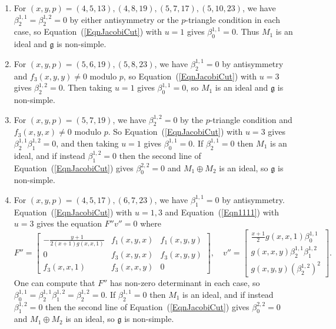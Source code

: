 \documentclass[11pt,a4paper,reqno]{amsart}
\theoremstyle{definition}
\numberwithin{equation}{section}
\newcommand{\fg}{\mathfrak{g}}
\begin{document}
\begin{enumerate}
\item For $(x,y,p)=(4,5,13),(4,8,19),(5,7,17),(5,10,23)$, we have $\beta^{1,1}_2=\beta^{1,2}_2=0$ by either antisymmetry or the $p$-triangle condition in each case, so Equation~(\ref{EqnJacobiCut}) with $u=1$ gives $\beta^{1,1}_0=0$. Thus $M_1$ is an ideal and $\fg$ is non-simple.
\item For $(x,y,p)=(5,6,19),(5,8,23)$, we have $\beta^{1,1}_2=0$ by antisymmetry and $f_3(x,y,y)\neq0$ modulo $p$, so Equation~(\ref{EqnJacobiCut}) with $u=3$ gives $\beta^{1,2}_2=0$. Then taking $u=1$ gives $\beta^{1,1}_0=0$, so $M_1$ is an ideal and $\fg$ is non-simple.
\item For $(x,y,p)=(5,7,19)$, we have $\beta^{1,2}_2=0$ by the $p$-triangle condition and $f_3(x,y,x)\neq0$ modulo $p$. So Equation~(\ref{EqnJacobiCut}) with $u=3$ gives $\beta^{1,1}_2\beta^{1,2}_1=0$, and then taking $u=1$ gives $\beta^{1,1}_0=0$. If $\beta^{1,1}_2=0$ then $M_1$ is an ideal, and if instead $\beta^{1,2}_1=0$ then the second line of Equation~(\ref{EqnJacobiCut}) gives $\beta^{2,2}_0=0$ and $M_1\oplus M_2$ is an ideal, so $\fg$ is non-simple.
\item For $(x,y,p)=(4,5,17),(6,7,23)$, we have $\beta^{1,1}_1=0$ by antisymmetry. Equation~(\ref{EqnJacobiCut}) with $u=1,3$ and Equation~(\ref{Eqn1111}) with $u=3$ gives the equation $F''v''=0$ where
\[F''=\begin{bmatrix}
-\frac{y+1}{2(x+1)g(x,x,1)} & f_1(x,y,x) & f_1(x,y,y) \\
0 & f_3(x,y,x) & f_3(x,y,y) \\
f_3(x,x,1) & f_3(x,x,y) & 0
\end{bmatrix},\quad
v''=\begin{bmatrix} \frac{x+1}2g(x,x,1)\beta^{1,1}_0 \\ g(x,x,y)\beta^{1,1}_2\beta^{1,2}_1 \\ g(x,y,y)(\beta^{1,2}_2)^2 \end{bmatrix}.\]
One can compute that $F''$ has non-zero determinant in each case, so $\beta^{1,1}_0=\beta^{1,1}_2\beta^{1,2}_1=\beta^{1,2}_2=0$. If $\beta^{1,1}_2=0$ then $M_1$ is an ideal, and if instead $\beta^{1,2}_1=0$ then the second line of Equation~(\ref{EqnJacobiCut}) gives $\beta^{2,2}_0=0$ and $M_1\oplus M_2$ is an ideal, so $\fg$ is non-simple.
\end{enumerate}
\end{document}
